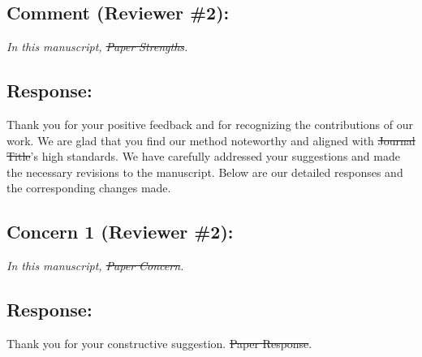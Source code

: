 
{}
\subsection*{Comment (Reviewer \#2):}
\textit{In this manuscript, \sout{Paper Strengths}.}

\subsection*{Response:}
Thank you for your positive feedback and for recognizing the contributions of our work.
We are glad that you find our method noteworthy and aligned with \sout{Journal Title}'s high standards.
We have carefully addressed your suggestions and made the necessary revisions to the manuscript.
Below are our detailed responses and the corresponding changes made.

{}
\subsection*{Concern 1 (Reviewer \#2):}
\textit{In this manuscript, \sout{Paper Concern}.}

\subsection*{Response:}
Thank you for your constructive suggestion.
\sout{Paper Response}.

